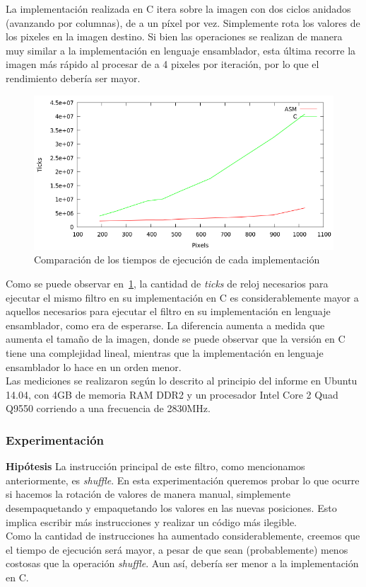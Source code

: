 \documentclass[a4paper]{article}
\begin{document}
La implementación realizada en C itera sobre la imagen con dos ciclos anidados (avanzando por columnas), de a un píxel por vez. Simplemente rota los valores de los pixeles en la imagen destino. Si bien las operaciones se realizan de manera muy similar a la implementación en lenguaje ensamblador, esta última recorre la imagen más rápido al procesar de a 4 pixeles por iteración, por lo que el rendimiento debería ser mayor.\\

\begin{figure}[H]
  \begin{center}
	\includegraphics[scale=0.77]{imagenes/rotarC.png}
	\caption{Comparación de los tiempos de ejecución de cada implementación}
	\label{rotar_asmvsc}
  \end{center}
\end{figure}

Como se puede observar en~\ref{rotar_asmvsc}, la cantidad de \textit{ticks} de reloj necesarios para ejecutar el mismo filtro en su implementación en C es considerablemente mayor a aquellos necesarios para ejecutar el filtro en su implementación en lenguaje ensamblador, como era de esperarse. La diferencia aumenta a medida que aumenta el tamaño de la imagen, donde se puede observar que la versión en C tiene una complejidad lineal, mientras que la implementación en lenguaje ensamblador lo hace en un orden menor.\\
Las mediciones se realizaron según lo descrito al principio del informe en Ubuntu 14.04, con 4GB de memoria RAM DDR2 y un procesador Intel Core 2 Quad Q9550 corriendo a una frecuencia de 2830MHz.

\subsubsection{Experimentación}
\textbf{Hipótesis}
\newline
La instrucción principal de este filtro, como mencionamos anteriormente, es \textit{shuffle}. En esta experimentación queremos probar lo que ocurre si hacemos la rotación de valores de manera manual, simplemente desempaquetando y empaquetando los valores en las nuevas posiciones. Esto implica escribir más instrucciones y realizar un código más ilegible.
\\Como la cantidad de instrucciones ha aumentado considerablemente, creemos que el tiempo de ejecución será mayor, a pesar de que sean (probablemente) menos costosas que la operación \textit{shuffle}. Aun así, debería ser menor a la implementación en C. 
\newline
\end{document}
